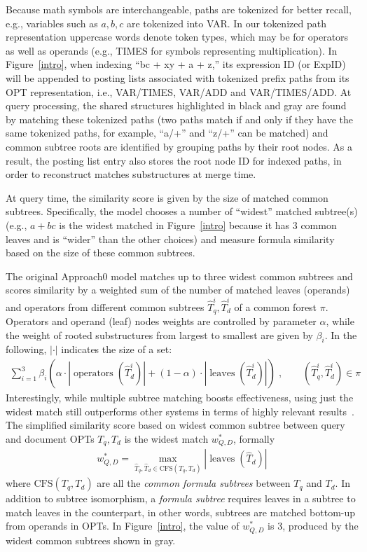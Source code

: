 \documentclass[runningheads]{llncs}
\begin{document}
Because math symbols are interchangeable, paths are tokenized for better recall, e.g., variables such as $a, b, c$ are tokenized into VAR. In our tokenized path representation uppercase words denote token types, which may be for operators as well as operands (e.g., TIMES for symbols representing multiplication).
In Figure~\ref{intro}, when indexing ``bc + xy + a + z,'' its expression ID (or ExpID) will be appended to posting lists associated with tokenized prefix paths from its OPT representation, i.e.,  VAR/TIMES, VAR/ADD and VAR/TIMES/ADD.
At query processing, the shared structures highlighted in black and gray are found by matching these tokenized paths (two paths match if and only if they have the same tokenized paths, for example, ``a/+'' and ``z/+'' can be matched) and common subtree roots are identified by grouping paths by their root nodes.
%
As a result, the posting list entry also stores the root node ID for indexed paths, in order to reconstruct matches substructures at merge time.

At query time, the similarity score is given by the size of matched common subtrees.
%
Specifically, the model chooses a number of ``widest'' matched subtree(s) (e.g., $a+bc$ is the widest matched in Figure~\ref{intro} because it has 3 common leaves and is ``wider'' than the other choices) and measure formula similarity based on the size of these common subtrees.

The original Approach0 model \cite{a0_2019} matches up to three widest common subtrees and scores similarity by a weighted sum of the number of matched leaves (operands) and operators from different common subtrees $\hat{T}_q^i, \hat{T}_d^i$ of a common forest $\pi$. Operators and operand (leaf) nodes weights are controlled by parameter $\alpha$, while the weight of rooted substructures from largest to smallest are given by $\beta_i$. In the following, $|\cdot|$ indicates the size of a set:
\begin{align}
\label{eq:1}
\sum^3_{i=1} \beta_i \left( \alpha \cdot \left|\operatorname{operators}(\hat{T}_d^i)\right| + (1 - \alpha) \cdot \left|\operatorname{leaves}(\hat{T}_d^i)\right| \right)\;, \qquad (\hat{T}_q^i, \hat{T}_d^i) \in \pi
\end{align}
%
Interestingly, while multiple subtree matching boosts effectiveness, using just the widest match still outperforms other systems in terms of highly relevant results~\cite{a0_2019}.
%
The simplified similarity score based on widest common subtree between query and document OPTs $T_q, T_d$ is the widest match $w^*_{Q, D}$, formally
\begin{align}
\label{eq:2}
w^*_{Q, D} = \max_{\hat{T}_q, \hat{T}_d \in \text{CFS}(T_q,T_d)} |\operatorname{leaves}(\hat{T}_d)|
\end{align}
where
$\text{CFS}(T_q, T_d)$ are all the \textit{common formula subtrees} between $T_q$ and $T_d$.
In addition to subtree isomorphism, a \emph{formula subtree} requires leaves in a subtree to match leaves in the counterpart, in other words, subtrees are matched bottom-up from operands in OPTs.
%
In Figure~\ref{intro}, the value of $w^*_{Q, D}$ is 3, produced by the widest common subtrees shown in gray.
\end{document}

